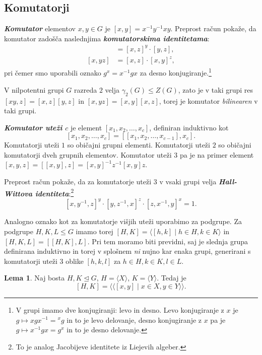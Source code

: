 \documentclass[11pt]{book}
\renewcommand{\llangle}{\langle\langle}
\renewcommand{\rrangle}{\rangle\rangle}
\def\definicija{\color{rdeca}\bf\em}
\theoremstyle{definition}
\theoremstyle{zgled}
\theoremstyle{odprtproblem}
\theoremstyle{domacanaloga}
\theoremstyle{izrek}
\newtheorem*{lema}{Lema}
\begin{document}
\subsection{Komutatorji}

{\definicija Komutator} elementov $x,y \in G$ je $[x,y] = x^{-1} y^{-1} x y$. Preprost račun pokaže, da komutator zadošča naslednjima {\definicija komutatorskima identitetama}:
\begin{align*}
[xy, z] &= [x,z]^y \cdot [y,z], \\
[x,yz] &= [x,z] \cdot [x,y]^z,
\end{align*}
pri čemer smo uporabili oznako $g^x = x^{-1} g x$ za desno konjugiranje.\footnote{V grupi imamo dve konjugiranji: levo in desno. Levo konjugiranje z $x$ je $g \mapsto x g x^{-1} = {}^x g$ in to je levo delovanje, desno konjugiranje z $x$ pa je $g \mapsto x^{-1} g x = g^x$ in to je desno delovanje.}

V nilpotentni grupi $G$ razreda $2$ velja $\gamma_2(G) \leq Z(G)$, zato je v taki grupi res $[xy,z] = [x,z][y,z]$ in $[x,yz] = [x,y][x,z]$, torej je komutator {\em bilinearen} v taki grupi.

{\definicija Komutator uteži $c$} je element $[x_1, x_2, \dots, x_c]$, definiran induktivno kot 
\[
[x_1, x_2, \dots, x_c] = [[x_1, x_2, \dots, x_{c-1}], x_c].
\]
Komutatorji uteži $1$ so običajni grupni elementi. Komutatorji uteži $2$ so običajni komutatorji dveh grupnih elementov. Komutator uteži $3$ pa je na primer element $[x,y,z] = [[x,y],z] = [x,y]^{-1} z^{-1} [x,y] z$.

Preprost račun pokaže, da za komutatorje uteži $3$ v vsaki grupi velja {\definicija Hall-Wittova identiteta}:\footnote{To je analog Jacobijeve identitete iz Liejevih algeber.}
\[
[x, y^{-1}, z]^y \cdot [y, z^{-1},x]^z \cdot [z, x^{-1}, y]^x = 1.
\]

Analogno oznako kot za komutatorje višjih uteži uporabimo za podgrupe. Za podgrupe $H,K,L \leq G$ imamo torej $[H,K] = \langle [h,k] \mid h \in H, k \in K \rangle$ in $[H,K,L] = [[H,K], L]$. Pri tem moramo biti previdni, saj je slednja grupa definirana induktivno in torej v splošnem {\em ni} nujno kar enaka grupi, generirani s komutatorji uteži $3$ oblike $[h,k,l]$ za $h \in H, k \in K, l \in L$.

\begin{lema}
Naj bosta $H,K \unlhd G$, $H = \langle X \rangle$, $K = \langle Y \rangle$. Tedaj je
\[
[H,K] = \llangle [x,y] \mid x \in X, y \in Y \rrangle.
\]
\vspace{-1.5\baselineskip}
\end{lema}
\end{document}
